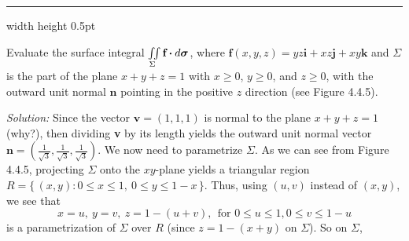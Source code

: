 \vspace{3mm}
\hrule width \textwidth height 0.5pt
\begin{exmp}\label{exmp:surfintex}
 Evaluate the surface integral $\iint\limits_{\Sigma} \textbf{f} \bm{\cdot} d\bm{\sigma}$, where
 $\textbf{f}(x,y,z) = yz\textbf{i} + xz\textbf{j} + xy\textbf{k}$ and $\Sigma$ is the part of the plane $x+y+z=1$
 with $x \ge 0$, $y \ge 0$, and $z \ge 0$, with the outward unit normal $\textbf{n}$ pointing in the positive $z$
 direction (see Figure 4.4.5).\vspace{0.5mm}
 \piccaption[]{}
 \par\noindent \emph{Solution:} Since the vector $\textbf{v} = (1,1,1)$ is normal to the plane $x+y+z=1$ (why?), then
 dividing \textbf{v} by its length yields the outward unit normal vector $\textbf{n} = \left( \frac{1}{\sqrt{3}},
 \frac{1}{\sqrt{3}},\frac{1}{\sqrt{3}} \right)$. We now need to parametrize $\Sigma$. As we can see from Figure 4.4.5,
 projecting $\Sigma$ onto the $xy$-plane yields a triangular region
 $R= \lbrace\,(x,y): 0 \le x \le 1,~ 0 \le y \le 1-x\,\rbrace$. Thus, using $(u,v)$ instead of $(x,y)$, we see that
 \begin{displaymath}
  x=u,~ y=v,~ z=1-(u+v),~~\text{for~} 0 \le u \le 1, 0 \le v \le 1-u
 \end{displaymath}
 is a parametrization of $\Sigma$ over $R$ (since $z=1-(x+y)$ on $\Sigma$). So on $\Sigma$,

\end{exmp}
